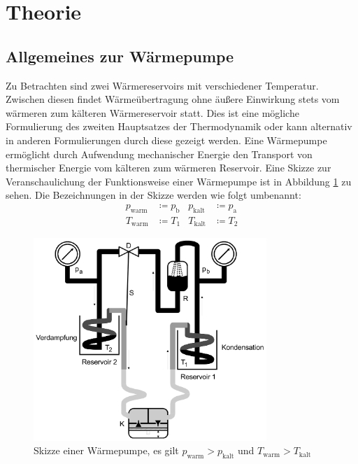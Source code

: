 \section{Theorie}
\label{sec:Theorie}
\subsection{Allgemeines zur Wärmepumpe}
Zu Betrachten sind zwei Wärmereservoirs mit verschiedener Temperatur.
Zwischen diesen findet Wärmeübertragung ohne äußere Einwirkung stets vom
wärmeren zum kälteren Wärmereservoir statt. Dies ist eine mögliche Formulierung des
zweiten Hauptsatzes der Thermodynamik oder kann alternativ in anderen Formulierungen
durch diese gezeigt werden. \newline
Eine Wärmepumpe ermöglicht durch Aufwendung mechanischer Energie den Transport von
thermischer Energie vom kälteren zum wärmeren Reservoir.
Eine Skizze zur Veranschaulichung der Funktionsweise einer Wärmepumpe ist in
Abbildung \ref{fig:waermepumpebild} zu sehen. Die Bezeichnungen in der Skizze werden
wie folgt umbenannt:
\begin{align*}
p_\text{warm} &\coloneqq p_\text{b} & p_\text{kalt} &\coloneqq p_\text{a} \\
T_\text{warm} &\coloneqq T_1 & T_\text{kalt} &\coloneqq T_2
\end{align*}

\begin{figure}[H]
  \centering
  \includegraphics[width=250pt]{data/waermepumpe.png}
  \caption{Skizze einer Wärmepumpe, es gilt $p_\text{warm} > p_\text{kalt}$ und $T_\text{warm} > T_\text{kalt}$ \cite{Versuchsanleitung}}
  \label{fig:waermepumpebild}
\end{figure}

